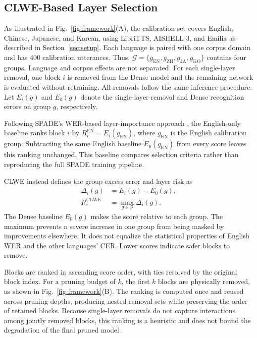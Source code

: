 \documentclass{article}
\begin{document}
\subsection{CLWE-Based Layer Selection}
\label{sec:clwe_selection}

As illustrated in Fig.~\ref{fig:framework}(A), the calibration set covers
English, Chinese, Japanese, and Korean, using LibriTTS, AISHELL-3,
and Emilia as described in Section~\ref{sec:setup}. Each language is
paired with one corpus domain and has 400 calibration utterances. Thus,
$\mathcal{G}=\{g_{\mathrm{EN}},g_{\mathrm{ZH}},g_{\mathrm{JA}},g_{\mathrm{KO}}\}$
contains four groups. Language and corpus effects are not separated.
For each single-layer removal,
one block $i$ is removed from the Dense model and the remaining network
is evaluated without retraining. All removals follow the same inference
procedure. Let $E_i(g)$ and $E_0(g)$ denote the single-layer-removal
and Dense recognition errors on group $g$, respectively.

Following SPADE's WER-based layer-importance approach
\cite{nguyen2026spade}, the English-only baseline ranks block $i$ by
$R_i^{\mathrm{EN}}=E_i(g_{\mathrm{EN}})$, where $g_{\mathrm{EN}}$ is
the English calibration group. Subtracting the same English baseline
$E_0(g_{\mathrm{EN}})$ from every score leaves this ranking unchanged.
This baseline compares selection criteria rather than reproducing the
full SPADE training pipeline.

CLWE instead defines the group excess error and layer risk as
\begin{equation}
\begin{aligned}
\Delta_i(g) &= E_i(g)-E_0(g), \\
R_i^{\mathrm{CLWE}}
&= \max_{g\in\mathcal{G}} \Delta_i(g),
\end{aligned}
\label{eq:clwe_risk}
\end{equation}
The Dense baseline $E_0(g)$ makes the score relative to each group.
The maximum prevents a severe increase in one group from being masked
by improvements elsewhere. It does not equalize the statistical
properties of English WER and the other languages' CER. Lower scores
indicate safer blocks to remove.

Blocks are ranked in ascending score order, with ties resolved by the
original block index. For a pruning budget of $k$, the first $k$ blocks
are physically removed, as shown in Fig.~\ref{fig:framework}(B). The
ranking is computed once and reused across pruning depths, producing
nested removal sets while preserving the order of retained blocks.
Because single-layer removals do not capture interactions among jointly
removed blocks, this ranking is a heuristic and does not bound the
degradation of the final pruned model.
\end{document}
